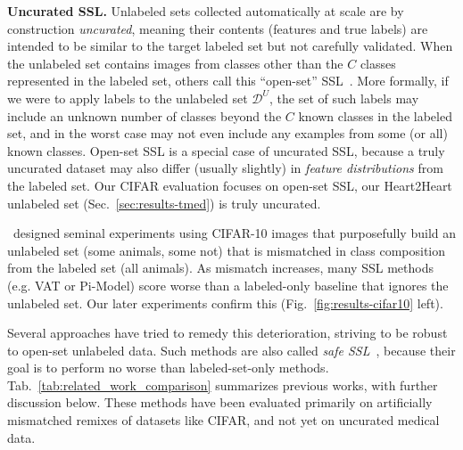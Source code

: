 \textbf{Uncurated SSL.}
Unlabeled sets collected automatically at scale are by construction \emph{uncurated}, meaning their contents (features and true labels) are intended to be similar to the target labeled set but not carefully validated.
When the unlabeled set contains images from classes other than the $C$ classes represented in the labeled set, others call this ``open-set'' SSL~\citep{yuMultiTaskCurriculumFramework2020}. 
More formally, if we were to apply labels to the unlabeled set $\mathcal{D}^U$, the set of such labels may include an unknown number of classes beyond the $C$ known classes in the labeled set, and in the worst case may not even include any examples from some (or all) known classes.
Open-set SSL is a special case of uncurated SSL, because a truly uncurated dataset may also differ (usually slightly) in \emph{feature distributions} from the labeled set.
Our CIFAR evaluation focuses on open-set SSL, our Heart2Heart unlabeled set (Sec.~\ref{sec:results-tmed}) is truly uncurated.

\citet{oliverRealisticEvaluationDeep2018}~designed seminal experiments using CIFAR-10 images that purposefully build an unlabeled set (some animals, some not) that is mismatched in class composition from the labeled set (all animals).
As mismatch increases, many SSL methods (e.g. VAT or Pi-Model) score worse than a labeled-only baseline that ignores the unlabeled set.
Our later experiments confirm this (Fig.~\ref{fig:results-cifar10} left).


Several approaches have tried to remedy this deterioration, striving to be robust to open-set unlabeled data.
Such methods are also called \textit{safe SSL}~\citep{guoSafeDeepSemiSupervised2020}, because their goal is to perform no worse than labeled-set-only methods.
Tab.~\ref{tab:related_work_comparison} summarizes previous works, with further discussion below.
These methods have been evaluated primarily on artificially mismatched remixes of datasets like CIFAR, and not yet on uncurated medical data.





